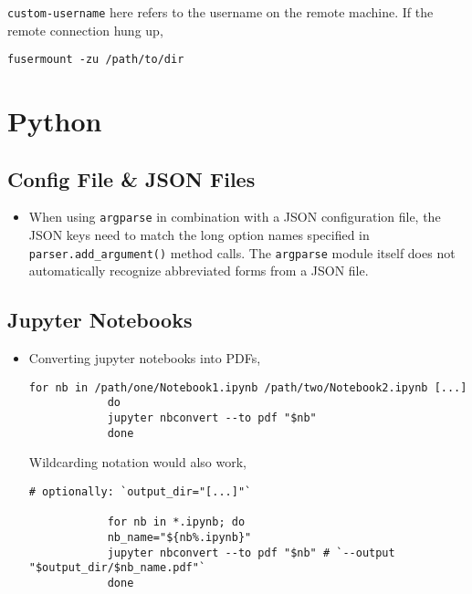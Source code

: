 \documentclass[12pt, a4paper]{scrbook}
\numberwithin{equation}{section}
\theoremstyle{definition}
\theoremstyle{definition}
\begin{document}
		\texttt{custom-username} here refers to the username on the remote machine. If the remote connection hung up,

		\begin{lstlisting}[style=mystylebash, label=alg:fusermount, xleftmargin=\parindent]
			fusermount -zu /path/to/dir
		\end{lstlisting}
	
	\chapter{Python}
	
	\section{Config File \& JSON Files}
	
	\begin{itemize}
		\item  When using \texttt{argparse} in combination with a JSON configuration file, the JSON keys need to match the long option names specified in \texttt{parser.add\_argument()} method calls. The \texttt{argparse} module itself does not automatically recognize abbreviated forms from a JSON file.
	\end{itemize} 
	
	\section{Jupyter Notebooks}
	
	\begin{itemize}
		\item Converting jupyter notebooks into PDFs,
		
		\begin{lstlisting}[style=mystylepython, label=alg:notebooks_to_pdf, xleftmargin=\parindent]
			for nb in /path/one/Notebook1.ipynb /path/two/Notebook2.ipynb [...]
			do
			jupyter nbconvert --to pdf "$nb"
			done 
		\end{lstlisting}
		
		Wildcarding notation would also work, 
		
		\begin{lstlisting}[style=mystylepython, label=alg:notebooks_to_pdf__wildcard, xleftmargin=\parindent]
			# optionally: `output_dir="[...]"`
			
			for nb in *.ipynb; do
			nb_name="${nb%.ipynb}"
			jupyter nbconvert --to pdf "$nb" # `--output "$output_dir/$nb_name.pdf"`
			done 
		\end{lstlisting}
		
	\end{itemize}
	
\end{document}
